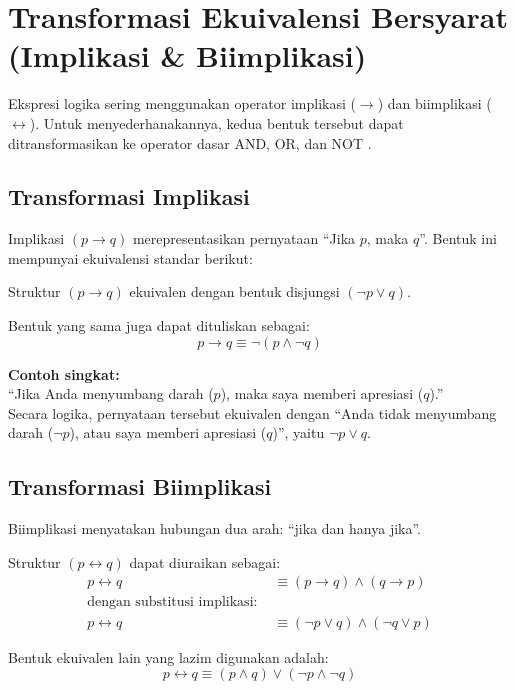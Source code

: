 \section{Transformasi Ekuivalensi Bersyarat (Implikasi \& Biimplikasi)}

Ekspresi logika sering menggunakan operator implikasi ($\rightarrow$) dan biimplikasi ($\leftrightarrow$). Untuk menyederhanakannya, kedua bentuk tersebut dapat ditransformasikan ke operator dasar AND, OR, dan NOT \cite{rosen2019}.

\subsection{Transformasi Implikasi}

Implikasi $(p \rightarrow q)$ merepresentasikan pernyataan ``Jika $p$, maka $q$''. Bentuk ini mempunyai ekuivalensi standar berikut:

\begin{teorema}
Struktur $(p \rightarrow q)$ ekuivalen dengan bentuk disjungsi $(\neg p \vee q)$.
\end{teorema}

Bentuk yang sama juga dapat dituliskan sebagai:
\[
p \rightarrow q \equiv \neg (p \wedge \neg q)
\]

\textbf{Contoh singkat:} \\
``Jika Anda menyumbang darah ($p$), maka saya memberi apresiasi ($q$).'' \\
Secara logika, pernyataan tersebut ekuivalen dengan ``Anda tidak menyumbang darah ($\neg p$), atau saya memberi apresiasi ($q$)'', yaitu $\neg p \vee q$.

\subsection{Transformasi Biimplikasi}

Biimplikasi menyatakan hubungan dua arah: ``jika dan hanya jika''.

\begin{teorema}
Struktur $(p \leftrightarrow q)$ dapat diuraikan sebagai:
\begin{align*}
    p \leftrightarrow q &\equiv (p \rightarrow q) \wedge (q \rightarrow p) \\
    \text{dengan substitusi implikasi: } & \\
    p \leftrightarrow q &\equiv (\neg p \vee q) \wedge (\neg q \vee p)
\end{align*}
\end{teorema}
Bentuk ekuivalen lain yang lazim digunakan adalah:
\[
p \leftrightarrow q \equiv (p \wedge q) \vee (\neg p \wedge \neg q)
\]


